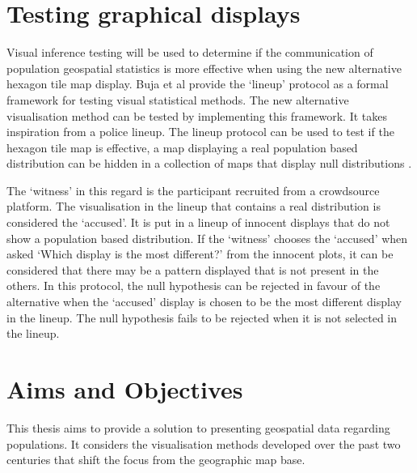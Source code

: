 \documentclass{monashthesis}
\begin{document}
\hypertarget{testing-graphical-displays}{%
\section{Testing graphical displays}\label{testing-graphical-displays}}

Visual inference testing will be used to determine if the communication of population geospatial statistics is more effective when using the new alternative hexagon tile map display.
Buja et al \autocite{GIIV} provide the `lineup' protocol as a formal framework for testing visual statistical methods. The new alternative visualisation method can be tested by implementing this framework.
It takes inspiration from a police lineup.
The lineup protocol can be used to test if the hexagon tile map is effective, a map displaying a real population based distribution can be hidden in a collection of maps that display null distributions \autocite{chowd}.

The `witness' in this regard is the participant recruited from a crowdsource platform.
The visualisation in the lineup that contains a real distribution is considered the `accused'.
It is put in a lineup of innocent displays that do not show a population based distribution.
If the `witness' chooses the `accused' when asked `Which display is the most different?' from the innocent plots, it can be considered that there may be a pattern displayed that is not present in the others.
In this protocol, the null hypothesis can be rejected in favour of the alternative when the `accused' display is chosen to be the most different display in the lineup. The null hypothesis fails to be rejected when it is not selected in the lineup.

\hypertarget{sec:aims}{%
\section{Aims and Objectives}\label{sec:aims}}

This thesis aims to provide a solution to presenting geospatial data regarding populations.
It considers the visualisation methods developed over the past two centuries that shift the focus from the geographic map base.
\end{document}
